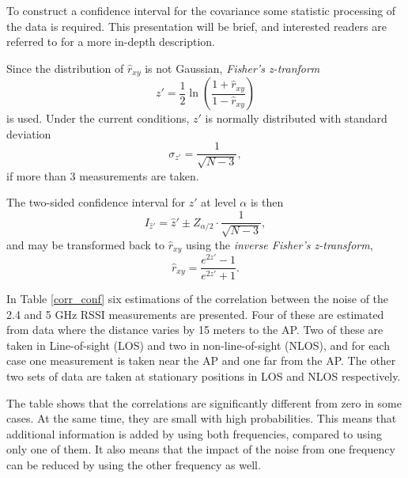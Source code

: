 \documentclass{LTHthesis}
\begin{document}
To construct a confidence interval for the covariance some statistic processing of the data is required. This presentation will be brief, and interested readers are referred to \cite{fisher15, fisher21}  for a more in-depth description. 

Since the distribution of $\hat r_{xy}$ is not Gaussian, \emph{Fisher's z-tranform}
%
\begin{equation}
z'=\frac{1}{2}\ln{\left(\frac{1+\hat r_{xy}}{1-\hat r_{xy}}\right)}
\end{equation}
%
is used. Under the current conditions, $ z'$ is normally distributed with standard deviation
%
\begin{equation}
\sigma_{z'}=\frac{1}{\sqrt{N-3}},
\end{equation} 
%
if more than 3 measurements are taken. 

The two-sided confidence interval for $z'$ at level $\alpha$ is then
%
\begin{equation}
I_{\hat z'} = \hat z' \pm Z_{\alpha/2}\cdot\frac{1}{\sqrt{N-3}}, 
\end{equation}
%
and may be transformed back to $\hat  r_{xy}$ using the \emph{inverse Fisher's z-transform},
%
\begin{equation}
\hat r_{xy}=\frac{e^{2z'}-1}{e^{2z'}+1}.
\end{equation}

In Table \ref{corr_conf} six estimations of the correlation between the noise of the 2.4 and 5 GHz RSSI measurements are presented. Four of these are estimated from data where the distance varies by 15 meters to the AP. Two of these are taken in Line-of-sight (LOS) and two in non-line-of-sight (NLOS), and for each case one measurement is taken near the AP and one far from the AP. The other two sets of data are taken at stationary positions in LOS and NLOS respectively.

The table shows that the correlations are significantly different from zero in some cases. At the same time, they are small with high probabilities. This means that additional information is added by using both frequencies, compared to using only one of them. It also means that the impact of the noise from one frequency can be reduced by using the other frequency as well.
\end{document}
